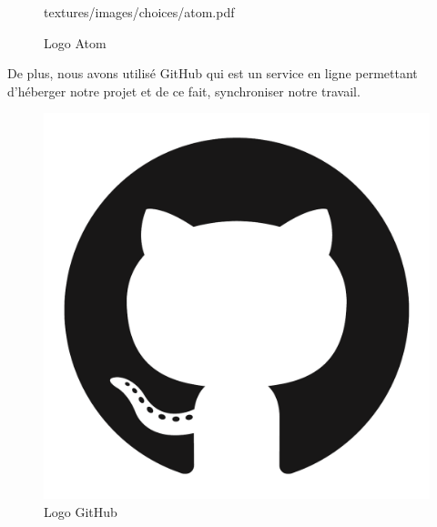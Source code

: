 \begin{figure}[!h]
\begin{minipage}[c]{0.4\textwidth}
  {textures/images/choices/atom.pdf}
\caption{Logo Atom}\label{atom}
\end{minipage}
\end{figure}

De plus, nous avons utilisé GitHub qui est un service en ligne permettant
d'héberger notre projet et de ce fait, synchroniser notre travail.

\begin{figure}[!h]
  \centering
  \includegraphics[scale=0.1]
  {textures/images/choices/github.pdf}
  \caption{Logo GitHub}
  \label{fig:github}
\end{figure}

